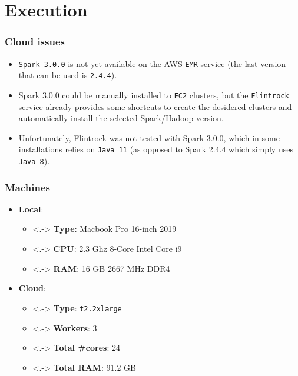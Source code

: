 \documentclass{beamer}
\begin{document}
\section{Execution}
\begin{frame}
  \frametitle{Cloud issues}
  \begin{itemize}[<+->]
    \item \texttt{Spark 3.0.0} is not yet available on the AWS \texttt{EMR} service (the last version that can be used is \texttt{2.4.4}).
    \item Spark 3.0.0 could be manually installed to \texttt{EC2} clusters, but the \texttt{Flintrock} service already provides some shortcuts to create the desidered clusters and automatically install the selected Spark/Hadoop version.
    \item Unfortunately, Flintrock was not tested with Spark 3.0.0, which in some installations relies on \texttt{Java 11} (as opposed to Spark 2.4.4 which simply uses \texttt{Java 8}).
  \end{itemize}
\end{frame}

\begin{frame}
  \frametitle{Machines}
  \begin{itemize}[<+->]
    \item \textbf{Local}:
    \begin{itemize}
      \item<.-> \textbf{Type}: Macbook Pro 16-inch 2019
      \item<.-> \textbf{CPU}: 2.3 Ghz 8-Core Intel Core i9
      \item<.-> \textbf{RAM}: 16 GB 2667 MHz DDR4
    \end{itemize}
    \item \textbf{Cloud}: 
      \begin{itemize}
        \item<.-> \textbf{Type}: \texttt{t2.2xlarge}
        \item<.-> \textbf{Workers}: 3
        \item<.-> \textbf{Total \#cores}: 24
        \item<.-> \textbf{Total RAM}: 91.2 GB
    \end{itemize}
  \end{itemize}
\end{frame}

\end{document}
